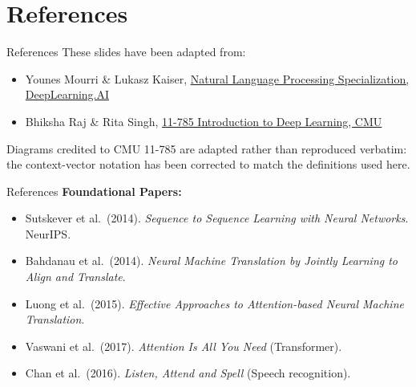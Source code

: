 \section{References}
\begin{frame}{References}
  These slides have been adapted from:
  \begin{itemize}
    \item[$\blacktriangleright$] Younes Mourri \& Lukasz Kaiser, \href{https://www.deeplearning.ai/specializations/natural-language-processing/}{Natural Language Processing Specialization, DeepLearning.AI}
    \item[$\blacktriangleright$] Bhiksha Raj \& Rita Singh, \href{https://deeplearning.cs.cmu.edu/}{11-785 Introduction to Deep Learning, CMU}
  \end{itemize}
  \vspace{1em}
  {\footnotesize Diagrams credited to CMU 11-785 are adapted rather than reproduced verbatim: the context-vector notation has been corrected to match the definitions used here.}
\end{frame}

\begin{frame}{References}
  \textbf{Foundational Papers:}
  \begin{itemize}
    \item[$\blacktriangleright$] Sutskever et al.\ (2014). \textit{Sequence to Sequence Learning with Neural Networks}. NeurIPS.
    \item[$\blacktriangleright$] Bahdanau et al.\ (2014). \textit{Neural Machine Translation by Jointly Learning to Align and Translate}.
    \item[$\blacktriangleright$] Luong et al.\ (2015). \textit{Effective Approaches to Attention-based Neural Machine Translation}.
    \item[$\blacktriangleright$] Vaswani et al.\ (2017). \textit{Attention Is All You Need} (Transformer).
    \item[$\blacktriangleright$] Chan et al.\ (2016). \textit{Listen, Attend and Spell} (Speech recognition).
  \end{itemize}
\end{frame}

